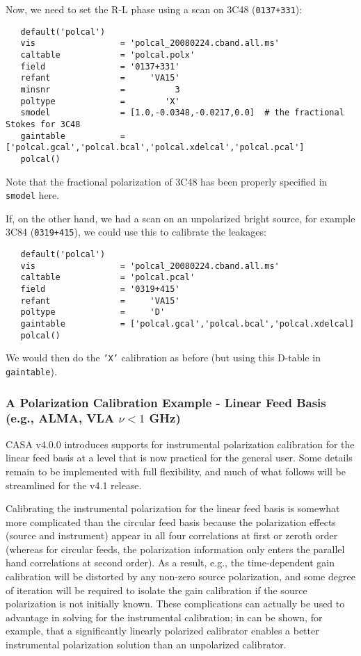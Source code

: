 Now, we need to set the R-L phase using a scan on
3C48 ({\tt 0137+331}):
\small
\begin{verbatim}
   default('polcal')
   vis                 = 'polcal_20080224.cband.all.ms'
   caltable            = 'polcal.polx'
   field               = '0137+331'
   refant              =     'VA15'        
   minsnr              =          3        
   poltype             =        'X'
   smodel              = [1.0,-0.0348,-0.0217,0.0]  # the fractional Stokes for 3C48
   gaintable           = ['polcal.gcal','polcal.bcal','polcal.xdelcal','polcal.pcal']
   polcal()
\end{verbatim}
\normalsize

Note that the fractional polarization of 3C48 has been properly specified 
in {\tt smodel} here.


If, on the other hand, we had a scan on an unpolarized bright source,
for example 3C84 ({\tt 0319+415}), we could use this to calibrate the
leakages:
\small
\begin{verbatim}
   default('polcal')
   vis                 = 'polcal_20080224.cband.all.ms'
   caltable            = 'polcal.pcal'
   field               = '0319+415'
   refant              =     'VA15'        
   poltype             =     'D'        
   gaintable           = ['polcal.gcal','polcal.bcal','polcal.xdelcal]
   polcal()
\end{verbatim}
\normalsize
We would then do the {\tt 'X'} calibration as before (but using this
D-table in {\tt gaintable}).

\subsubsection{A Polarization Calibration Example - Linear Feed
  Basis (e.g., ALMA, VLA $\nu<1$ GHz)}
\label{section:cal.solve.pol.example2}

CASA v4.0.0 introduces supports for instrumental polarization 
calibration for the linear feed basis at a level that is now
practical for the general user.  Some details remain to be
implemented with full flexibility, and much of what follows
will be streamlined for the v4.1 release.

Calibrating the instrumental polarization for the linear feed basis
is somewhat more complicated than the circular feed basis because
the polarization effects (source and instrument) appear in all
four correlations at first or zeroth order (whereas for circular
feeds, the polarization information only enters the parallel
hand correlations at second order).   As a result, e.g., the 
time-dependent gain calibration will be distorted by any non-zero 
source polarization, and some degree of iteration will be required to
isolate the gain calibration if the source polarization is not
initially known.  These complications can actually be used to 
advantage in solving for the instrumental calibration; in can
be shown, for example, that a significantly linearly polarized
calibrator enables a better instrumental polarization 
solution than an unpolarized calibrator.

